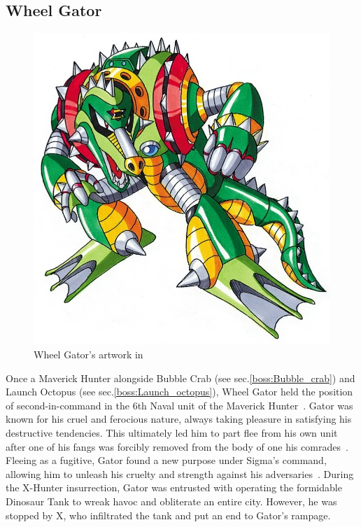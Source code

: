 \subsection{Wheel Gator}\label{boss:Wheel_gator}
\begin{figure}[htp]
	\centering
	\includegraphics[height=\portraitsize]{figures/X2/Wheel_gator/Wheel_Gator.png}
	\caption{Wheel Gator's artwork in \cite{book:MMX_Complete_art}}
\end{figure}

Once a Maverick Hunter alongside Bubble Crab (see sec.\ref{boss:Bubble_crab}) and Launch Octopus (see sec.\ref{boss:Launch_octopus}), Wheel Gator held the position of second-in-command in the 6th Naval unit of the Maverick Hunter~\cite{Xcoll1:Manual_X2}. Gator was known for his cruel and ferocious nature, always taking pleasure in satisfying his destructive tendencies. This ultimately led him to part flee from his own unit after one of his fangs was forcibly removed from the body of one his comrades~\cite{wayback:X2_resources}. Fleeing as a fugitive, Gator found a new purpose under Sigma's command, allowing him to unleash his cruelty and strength against his adversaries~\cite{wiki:Wheel_gator}. During the X-Hunter insurrection, Gator was entrusted with operating the formidable Dinosaur Tank to wreak havoc and obliterate an entire city. However, he was stopped by X, who infiltrated the tank and put an end to Gator's rampage.

